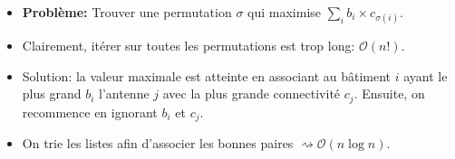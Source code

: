 \begin{frame}
    \frametitle{\problemtitle}
    \begin{itemize}
        \item<+-> \textbf{Problème:} Trouver une permutation $\sigma$ qui maximise $\sum_{i} b_i \times c_{\sigma(i)}$.
        \item<+-> Clairement, itérer sur toutes les permutations est trop long: $\mathcal{O}(n!)$.
        \item<+-> Solution: la valeur maximale est atteinte en associant au bâtiment $i$ ayant le plus grand $b_i$ l'antenne $j$ avec la plus grande connectivité $c_j$. Ensuite, on recommence en ignorant $b_i$ et $c_j$.
        \item<+-> On trie les listes afin d'associer les bonnes paires $\rightsquigarrow \mathcal{O}(n \log n)$.
    \end{itemize}
\end{frame}
